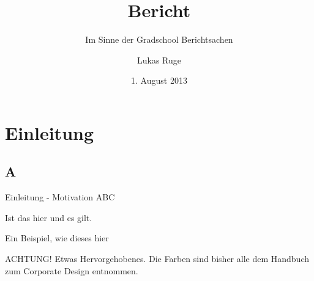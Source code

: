 \documentclass[german,10pt,xcolor=colortbl,compress
]{beamer}
\title{Bericht}
\subtitle{Im Sinne der Gradschool Berichtsachen}
\date[]{1. August 2013}
\author[L. Ruge]{Lukas Ruge}
\institute[Universität zu Lübeck]{Institut of Telematics\\Universität zu Lübeck}
\begin{document}
	\maketitle	
	\section{Einleitung}
	\begin{frame}{}
		\tableofcontents
	\end{frame}
	\subsection{A}
	\begin{frame}{Einleitung - Motivation}
	ABC
	\begin{lemma}
		Ist das hier und es gilt.
	\end{lemma}
	\begin{example}
		Ein Beispiel, wie dieses hier
	\end{example}
	\alert{ACHTUNG!}
		Etwas Hervorgehobenes. Die Farben sind bisher alle dem Handbuch zum Corporate Design entnommen.
	\end{frame}
\end{document}

